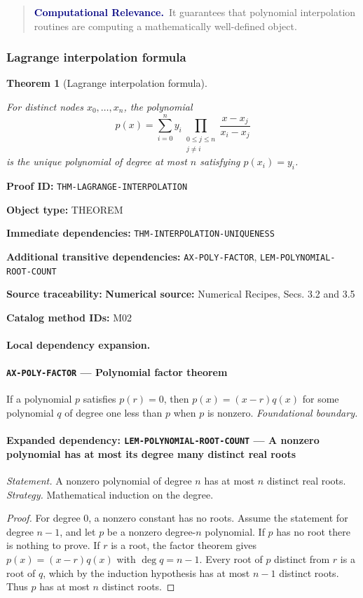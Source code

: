 \documentclass[10pt]{article}
\newcommand{\pidraw}[1]{\begingroup\urlstyle{tt}\nolinkurl{#1}\endgroup}
\newtheorem{theorem}{Theorem}[section]
\theoremstyle{definition}
\theoremstyle{remark}
\newenvironment{computationalrelevance}
{\begin{quote}\small\noindent\textbf{\textcolor{navy}{Computational Relevance.}}\ }
{\end{quote}}
\newcommand{\meta}[2]{\noindent\textbf{#1:} #2\par}
\begin{document}
\begin{computationalrelevance}It guarantees that polynomial interpolation routines are computing a mathematically well-defined object.\end{computationalrelevance}

\subsubsection{Lagrange interpolation formula}

\begin{theorem}[Lagrange interpolation formula]\label{prf:THM-LAGRANGE-INTERPOLATION}

For distinct nodes $x_0,\ldots,x_n$, the polynomial
\[
p(x)=\sum_{i=0}^n y_i
\prod_{\substack{0\le j\le n\\j\ne i}}
\frac{x-x_j}{x_i-x_j}
\]
is the unique polynomial of degree at most $n$ satisfying $p(x_i)=y_i$.

\end{theorem}

\meta{Proof ID}{\pidraw{THM-LAGRANGE-INTERPOLATION}}
\meta{Object type}{THEOREM}
\meta{Immediate dependencies}{\pidraw{THM-INTERPOLATION-UNIQUENESS}}
\meta{Additional transitive dependencies}{\pidraw{AX-POLY-FACTOR}, \pidraw{LEM-POLYNOMIAL-ROOT-COUNT}}
\meta{Source traceability}{\textbf{Numerical source:} Numerical Recipes, Secs. 3.2 and 3.5}
\meta{Catalog method IDs}{M02}

\paragraph{Local dependency expansion.}

\paragraph{\pidraw{AX-POLY-FACTOR} --- Polynomial factor theorem}
If a polynomial $p$ satisfies $p(r)=0$, then $p(x)=(x-r)q(x)$ for some polynomial $q$ of degree one less than $p$ when $p$ is nonzero.
\textit{Foundational boundary.}

\paragraph{Expanded dependency: \pidraw{LEM-POLYNOMIAL-ROOT-COUNT} --- A nonzero polynomial has at most its degree many distinct real roots}
\textit{Statement.} A nonzero polynomial of degree $n$ has at most $n$ distinct real roots.
\textit{Strategy.} Mathematical induction on the degree.
\begin{proof}For degree $0$, a nonzero constant has no roots. Assume the statement for degree
$n-1$, and let $p$ be a nonzero degree-$n$ polynomial. If $p$ has no root there is
nothing to prove. If $r$ is a root, the factor theorem gives
$p(x)=(x-r)q(x)$ with $\deg q=n-1$. Every root of $p$ distinct from $r$ is a
root of $q$, which by the induction hypothesis has at most $n-1$ distinct roots.
Thus $p$ has at most $n$ distinct roots.\end{proof}
\end{document}
